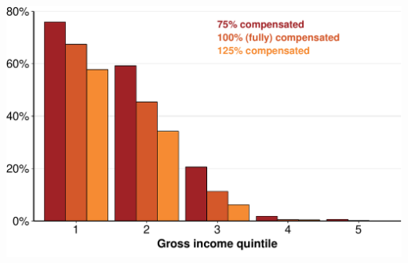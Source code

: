 \documentclass[a4paper,landscape]{article}\usepackage[]{graphicx}\usepackage[]{color}
\newenvironment{knitrout}{}{} %
\begin{document}
\begin{knitrout}
\color{fgcolor}
\includegraphics[width=11.000in,height=7.00in]{figure/GST-Figure-7-1} 

\end{knitrout}
\end{document}
